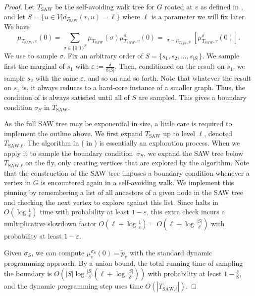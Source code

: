 \documentclass[10pt,a4paper]{article}
\newcommand{\Ex}{\mathop{\mathbb{{}E}}\nolimits}
\newcommand{\abs}[1]{\ensuremath{\left\vert#1\right\vert}}
\newcommand{\eps}{\varepsilon}
\newcommand{\defeq}{:=}
\newcommand{\TSAW}{T_{\mathrm{SAW}}}
\begin{document}
\begin{proof}
Let $\TSAW$ be the self-avoiding walk tree for $G$ rooted at $v$ as defined in , and let $S=\{u\in V|d_{\TSAW}(v,u)=\ell\}$ where $\ell$ is a parameter we will fix later. We have
\[\mu_{\TSAW,v}(0)=\sum_{\sigma\in\{0,1\}^S}\mu_{\TSAW}(\sigma)\mu_{\TSAW,v}^\sigma(0)=\Ex_{\sigma\sim\mu_{\TSAW,S}}[\mu_{\TSAW,v}^\sigma(0)].\]
We use  to sample $\sigma$.
Fix an arbitrary order of $S=\{s_1,s_2,\ldots,s_{\abs{S}}\}$.
We sample first the marginal of $s_1$ with $\eps\defeq\frac{\delta}{8\abs{S}}$.
Then, conditioned on the result on $s_1$, we sample $s_2$ with the same $\eps$, and so on and so forth.
Note that whatever the result on $s_1$ is, it always reduces to a hard-core instance of a smaller graph.
Thus, the condition of  is always satisfied until all of $S$ are sampled.
This gives a boundary condition $\sigma_S$ in $\TSAW$.

As the full SAW tree may be exponential in size,
a little care is required to implement the outline above.
We first expand $\TSAW$ up to level $\ell$, denoted $T_\textrm{SAW,$\ell$}$. %
The algorithm in  ( in ) is essentially an exploration process.
When we apply it to sample the boundary condition~$\sigma_S$,
we expand the SAW tree below $T_\textrm{SAW,$\ell$}$ on the fly,
only creating vertices that are explored by the algorithm.
Note that the construction of the SAW tree imposes a boundary condition whenever a vertex in $G$ is encountered again in a self-avoiding walk.
We implement this pinning by remembering a list of all ancestors of a given node in the SAW tree and checking the next vertex to explore against this list.
Since  halts in $O(\log\frac{1}{\eps})$ time with probability at least $1-\eps$,
this extra check incurs a multiplicative slowdown factor $O(\ell+\log\frac{1}{\eps})=O(\ell+\log\frac{\abs{S}}{\delta})$ with probability at least $1-\eps$. 

Given $\sigma_S$, we can compute $\mu_v^{\sigma_S}(0)=\widetilde{p}_v$ with the standard dynamic programming approach.
By a union bound, the total running time of sampling the boundary is $O(\abs{S}\log\frac{\abs{S}}{\delta}(\ell+\log\frac{\abs{S}}{\delta}))$ with probability at least $1-\frac{\delta}{8}$,
  and the dynamic programming step uses time $O(\abs{T_\textrm{SAW,$\ell$}})$.


\end{proof}
\end{document}
